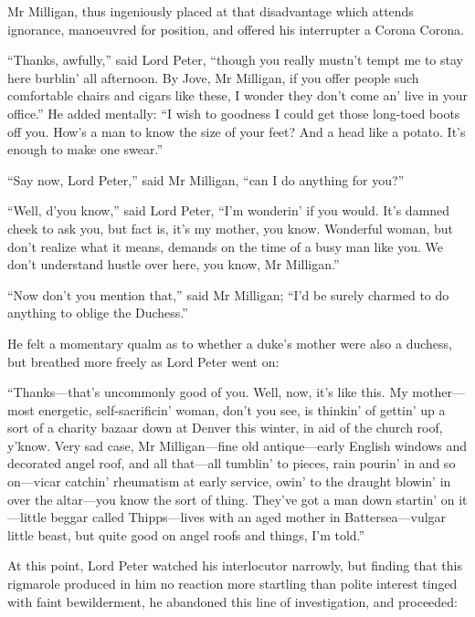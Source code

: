 Mr Milligan, thus ingeniously placed at that disadvantage which attends ignorance, manoeuvred for position, and offered his interrupter a Corona Corona.

\enquote{Thanks, awfully,} said Lord Peter, \enquote{though you really mustn’t tempt me to stay here burblin’ all afternoon. By Jove, Mr Milligan, if you offer people such comfortable chairs and cigars like these, I wonder they don’t come an’ live in your office.} He added mentally: \enquote{I wish to goodness I could get those long-toed boots off you. How’s a man to know the size of your feet? And a head like a potato. It’s enough to make one swear.}

\enquote{Say now, Lord Peter,} said Mr Milligan, \enquote{can I do anything for you?}

\enquote{Well, d’you know,} said Lord Peter, \enquote{I’m wonderin’ if you would. It’s damned cheek to ask you, but fact is, it’s my mother, you know. Wonderful woman, but don’t realize what it means, demands on the time of a busy man like you. We don’t understand hustle over here, you know, Mr Milligan.}

\enquote{Now don’t you mention that,} said Mr Milligan; \enquote{I’d be surely charmed to do anything to oblige the Duchess.}

He felt a momentary qualm as to whether a duke’s mother were also a duchess, but breathed more freely as Lord Peter went on:

\enquote{Thanks\allowbreak---\allowbreak that’s uncommonly good of you. Well, now, it’s like this. My mother\allowbreak---\allowbreak most energetic, self-sacrificin’ woman, don’t you see, is thinkin’ of gettin’ up a sort of a charity bazaar down at Denver this winter, in aid of the church roof, y’know. Very sad case, Mr Milligan\allowbreak---\allowbreak fine old antique\allowbreak---\allowbreak early English windows and decorated angel roof, and all that\allowbreak---\allowbreak all tumblin’ to pieces, rain pourin’ in and so on\allowbreak---\allowbreak vicar catchin’ rheumatism at early service, owin’ to the draught blowin’ in over the altar\allowbreak---\allowbreak you know the sort of thing. They’ve got a man down startin’ on it\allowbreak---\allowbreak little beggar called Thipps\allowbreak---\allowbreak lives with an aged mother in Battersea\allowbreak---\allowbreak vulgar little beast, but quite good on angel roofs and things, I’m told.}

At this point, Lord Peter watched his interlocutor narrowly, but finding that this rigmarole produced in him no reaction more startling than polite interest tinged with faint bewilderment, he abandoned this line of investigation, and proceeded:

